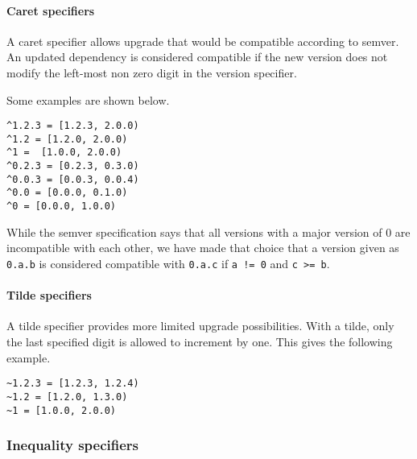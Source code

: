 \hypertarget{15797390643720760817}{}


\paragraph{Caret specifiers}



A caret specifier allows upgrade that would be compatible according to semver. An updated dependency is considered compatible if the new version does not modify the left-most non zero digit in the version specifier.



Some examples are shown below.




\begin{lstlisting}
^1.2.3 = [1.2.3, 2.0.0)
^1.2 = [1.2.0, 2.0.0)
^1 =  [1.0.0, 2.0.0)
^0.2.3 = [0.2.3, 0.3.0)
^0.0.3 = [0.0.3, 0.0.4)
^0.0 = [0.0.0, 0.1.0)
^0 = [0.0.0, 1.0.0)
\end{lstlisting}



While the semver specification says that all versions with a major version of 0 are incompatible with each other, we have made that choice that a version given as \texttt{0.a.b} is considered compatible with \texttt{0.a.c} if \texttt{a != 0} and  \texttt{c >= b}.



\hypertarget{15862646148226490878}{}


\paragraph{Tilde specifiers}



A tilde specifier provides more limited upgrade possibilities. With a tilde, only the last specified digit is allowed to increment by one. This gives the following example.




\begin{lstlisting}
~1.2.3 = [1.2.3, 1.2.4)
~1.2 = [1.2.0, 1.3.0)
~1 = [1.0.0, 2.0.0)
\end{lstlisting}



\hypertarget{3271687203032681122}{}


\subsubsection{Inequality specifiers}



